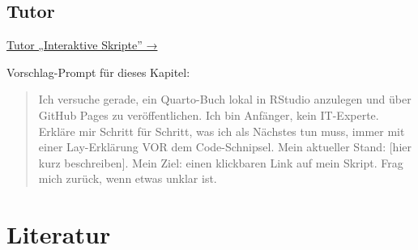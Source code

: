 \documentclass[
  ngerman,
  a4paper,
  DIV=11]{scrreprt}
\begin{document}
\section{Tutor}\label{tutor-1}

\begin{tcolorbox}[enhanced jigsaw, opacitybacktitle=0.6, leftrule=.75mm, title=\textcolor{quarto-callout-tip-color}{\faLightbulb}\hspace{0.5em}{Tutor öffnen}, colframe=quarto-callout-tip-color-frame, arc=.35mm, toprule=.15mm, colbacktitle=quarto-callout-tip-color!10!white, bottomrule=.15mm, colback=white, rightrule=.15mm, breakable, toptitle=1mm, bottomtitle=1mm, opacityback=0, titlerule=0mm, coltitle=black, left=2mm]

\href{https://chatgpt.com/g/g-69fec93348108191af1ffb8ce0cf6712-tutor-interaktive-skripte}{Tutor
„Interaktive Skripte'' →}

Vorschlag-Prompt für dieses Kapitel:

\begin{quote}
Ich versuche gerade, ein Quarto-Buch lokal in RStudio anzulegen und über
GitHub Pages zu veröffentlichen. Ich bin Anfänger, kein IT-Experte.
Erkläre mir Schritt für Schritt, was ich als Nächstes tun muss, immer
mit einer Lay-Erklärung VOR dem Code-Schnipsel. Mein aktueller Stand:
{[}hier kurz beschreiben{]}. Mein Ziel: einen klickbaren Link auf mein
Skript. Frag mich zurück, wenn etwas unklar ist.
\end{quote}

\end{tcolorbox}

\chapter*{Literatur}\label{literatur-1}

\end{document}
